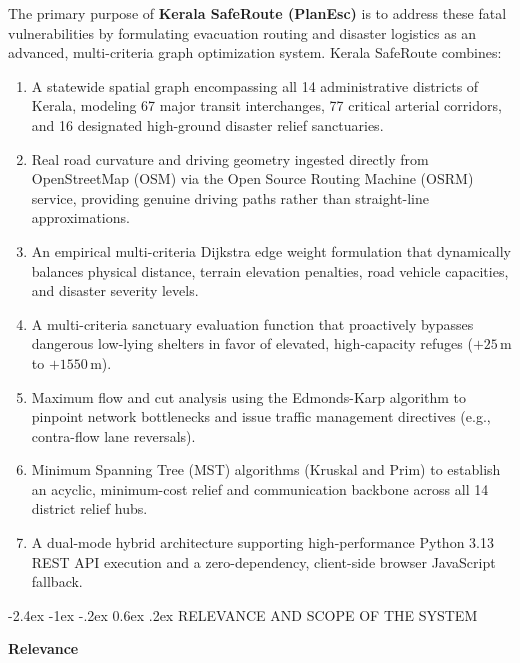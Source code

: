 \documentclass[12pt,oneside]{report}
\makeatletter
\renewcommand{\section}{\@startsection{section}{1}{\z@}%
  {-2.4ex \@plus -1ex \@minus -.2ex}%
  {0.6ex \@plus .2ex}%
  {\normalfont\large\bfseries}}
\makeatother
\begin{document}
The primary purpose of \textbf{Kerala SafeRoute (PlanEsc)} is to address these fatal vulnerabilities by formulating evacuation routing and disaster logistics as an advanced, multi-criteria graph optimization system. Kerala SafeRoute combines:
\begin{enumerate}
    \item A statewide spatial graph encompassing all 14 administrative districts of Kerala, modeling 67 major transit interchanges, 77 critical arterial corridors, and 16 designated high-ground disaster relief sanctuaries.
    \item Real road curvature and driving geometry ingested directly from OpenStreetMap (OSM) via the Open Source Routing Machine (OSRM) service, providing genuine driving paths rather than straight-line approximations.
    \item An empirical multi-criteria Dijkstra edge weight formulation that dynamically balances physical distance, terrain elevation penalties, road vehicle capacities, and disaster severity levels.
    \item A multi-criteria sanctuary evaluation function that proactively bypasses dangerous low-lying shelters in favor of elevated, high-capacity refuges ($+25$\,m to $+1550$\,m).
    \item Maximum flow and cut analysis using the Edmonds-Karp algorithm to pinpoint network bottlenecks and issue traffic management directives (e.g., contra-flow lane reversals).
    \item Minimum Spanning Tree (MST) algorithms (Kruskal and Prim) to establish an acyclic, minimum-cost relief and communication backbone across all 14 district relief hubs.
    \item A dual-mode hybrid architecture supporting high-performance Python 3.13 REST API execution and a zero-dependency, client-side browser JavaScript fallback.
\end{enumerate}

\newpage
\section{RELEVANCE AND SCOPE OF THE SYSTEM}

\textbf{Relevance}
\end{document}
